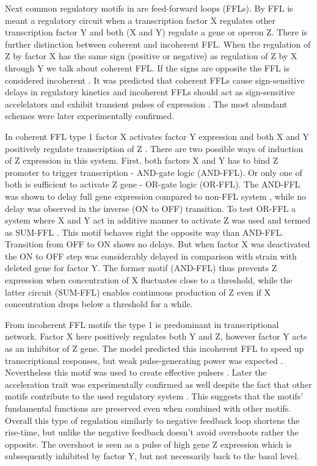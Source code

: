 Next common regulatory motifs in  are feed-forward loops (FFLs).
By FFL is meant a regulatory circuit when a transcription factor X regulates other transcription factor Y and both (X and Y) regulate a gene or operon Z.
There is further distinction between coherent and incoherent FFL.
When the regulation of Z by factor X has the same sign (positive or negative) as regulation of Z by X through Y we talk about coherent FFL.
If the signs are opposite the FFL is considered incoherent \cite{shen2002network}.
It was predicted that coherent FFLs cause sign-sensitive delays in regulatory kinetics and incoherent FFLs should act as sign-sensitive accelelators and exhibit transient pulses of expression \cite{mangan2003structure}.
The most abundant schemes were later experimentally confirmed.

In coherent FFL type 1 factor X activates factor Y expression and both X and Y positively regulate transcription of Z \cite{mangan2003structure}.
There are two possible ways of induction of Z expression in this system.
First, both factors X and Y has to bind Z promoter to trigger transcription - AND-gate logic (AND-FFL).
Or only one of both is sufficient to activate Z gene - OR-gate logic (OR-FFL).
The AND-FFL was shown to delay full gene expression compared to non-FFL system \cite{mangan2003coherent}, while no delay was observed in the inverse (ON to OFF) transition.
To test OR-FFL a system where X and Y act in additive manner to activate Z was used and termed as SUM-FFL \cite{kalir2005coherent}.
This motif behaves right the opposite way than AND-FFL.
Transition from OFF to ON shows no delays.
But when factor X was deactivated the ON to OFF step was considerably delayed in comparison with strain with deleted gene for factor Y.
The former motif (AND-FFL) thus prevents Z expression when concentration of X fluctuates close to a threshold, while the latter circuit (SUM-FFL) enables continuous production of Z even if X concentration drops below a threshold for a while.

From incoherent FFL motifs the type 1 is predominant in  transcriptional network.
Factor X here positively regulates both Y and Z, however factor Y acts as an inhibitor of Z gene.
The model predicted this incoherent FFL to speed up transcriptional responses, but weak pulse-generating power was expected \cite{mangan2003structure}.
Nevertheless this motif was used to create effective pulsers \cite{basu2004spatiotemporal}.
Later the acceleration trait was experimentally confirmed as well despite the fact that other motifs contribute to the used regulatory system \cite{mangan2006incoherent}.
This suggests that the motifs' fundamental functions are preserved even when combined with other motifs.
Overall this type of regulation similarly to negative feedback loop shortens the rise-time, but unlike the negative feedback doesn't avoid overshoots rather the opposite.
The overshoot is seen as a pulse of high gene Z expression which is subsequently inhibited by factor Y, but not necessarily back to the basal level.


